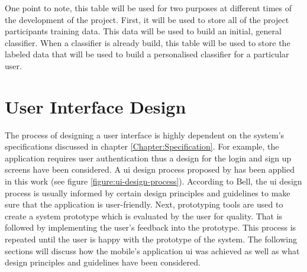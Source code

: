         One point to note, this table will be used for two purposes at different times of the development of the project. First, it will be used to store all of the project participants training data. This data will be used to build an initial, general classifier. When a classifier is already build, this table will be used to store the labeled data that will be used to build a personalised classifier for a particular user.
    
    
        
    \section{User Interface Design}
    \label{section:user_interface_design}
    The process of designing a user interface is highly dependent on the system's specifications discussed in chapter \ref{Chapter:Specification}. For example, the application requires user authentication thus a design for the login and sign up screens have been considered. A \gls{ui} design process proposed by \citet[60]{bell2005} has been applied in this work (see figure \ref{figure:ui-design-process}). According to Bell, the \gls{ui} design process is usually informed by certain design principles and guidelines to make sure that the application is user-friendly. Next, prototyping tools are used to create a system prototype which is evaluated by the user for quality. That is followed by implementing the user's feedback into the prototype. This process is repeated until the user is happy with the prototype of the system. The following sections will discuss how the mobile's application \gls{ui} was achieved as well as what design principles and guidelines have been considered.
    
